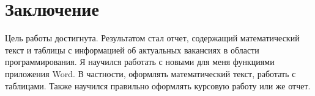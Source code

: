 \newpage
\section*{Заключение}
Цель работы достигнута. Результатом стал отчет, содержащий математический текст и таблицы с информацией об актуальных вакансиях в области программирования. Я научился работать с новыми для меня функциями приложения Word. В частности, оформлять математический текст, работать с таблицами. Также научился правильно оформлять курсовую работу или же отчет.
